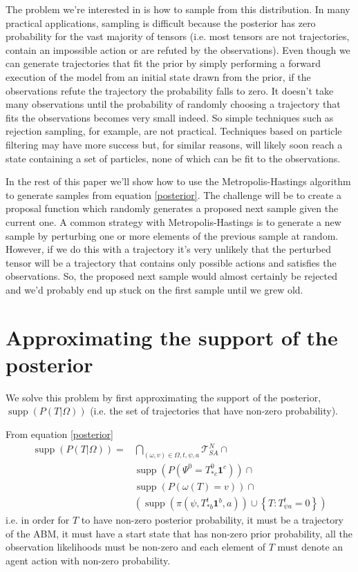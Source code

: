 \documentclass{article}
\DeclareMathOperator\supp{supp}
\begin{document}
The problem we're interested in is how to sample from this distribution. In many practical applications, sampling is difficult because the posterior has zero probability for the vast majority of tensors (i.e. most tensors are not trajectories, contain an impossible action or are refuted by the observations). Even though we can generate trajectories that fit the prior by simply performing a forward execution of the model from an initial state drawn from the prior, if the observations refute the trajectory the probability falls to zero. It doesn't take many observations until the probability of randomly choosing a trajectory that fits the observations becomes very small indeed. So simple techniques such as rejection sampling, for example, are not practical. Techniques based on particle filtering may have more success but, for similar reasons, will likely soon reach a state containing a set of particles, none of which can be fit to the observations.

In the rest of this paper we'll show how to use the Metropolis-Hastings algorithm to generate samples from equation \eqref{posterior}. The challenge will be to create a proposal function which randomly generates a proposed next sample given the current one. A common strategy with Metropolis-Hastings is to generate a new sample by perturbing one or more elements of the previous sample at random. However, if we do this with a trajectory it's very unlikely that the perturbed tensor will be a trajectory that contains only possible actions and satisfies the observations. So, the proposed next sample would almost certainly be rejected and we'd probably end up stuck on the first sample until we grew old.

\section{Approximating the support of the posterior}

We solve this problem by first approximating the support of the posterior, $\supp(P(T|\Omega))$ (i.e. the set of trajectories that have non-zero probability).

From equation \eqref{posterior}
\begin{equation}
\begin{aligned}
\supp (P( T |\Omega)) = 
& \bigcap_{(\omega,v) \in \Omega,t, \psi, a} \mathcal{T}^N_{SA} \cap \\ 
&\supp(P(\Psi^0 = T^0_{* c}\mathbf{1}^c)) \cap \\
& \supp\left(P\left(\omega(T)=v\right)\right) \cap \\
&\left( \supp\left(\pi(\psi,T^t_{* b}\mathbf{1}^b,a)\right) \cup \left\{T:T^t_{\psi a} = 0\right\} \right)
\end{aligned}
\label{support}
\end{equation}
i.e. in order for $T$ to have non-zero posterior probability, it must be a trajectory of the ABM, it must have a start state that has non-zero prior probability, all the observation likelihoods must be non-zero and each element of $T$ must denote an agent action with non-zero probability.
\end{document}
